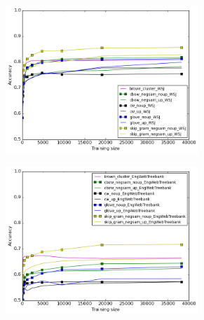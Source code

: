 \begin{figure}[h]
\caption{POS-Tagging out-of-vocabulary-words accuracy for \textit{in-domain} and \textit{out-of-domain} test sets}
\centering
\begin{subfigure}{.5\textwidth}
	\centering
    	\includegraphics[width=0.8\textwidth]{plots/POS-OOV-IN.png}
	\label{fig:inpos}
\end{subfigure}
\begin{subfigure}{.5\textwidth}
	\centering
    	\includegraphics[width=0.8\textwidth]{plots/POS-OOV-OUT.png}
	\label{fig:outpos}
\end{subfigure}  	
\end{figure} 

